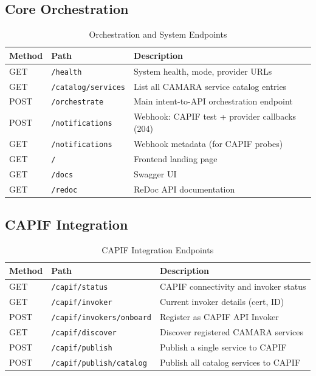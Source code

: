 \documentclass[conference]{IEEEtran}
\begin{document}
\subsection{Core Orchestration}

\begin{table}[H]
\centering
\caption{Orchestration and System Endpoints}
\label{tab:api-core}
\scriptsize
\begin{tabularx}{\columnwidth}{llX}
\toprule
\textbf{Method} & \textbf{Path} & \textbf{Description} \\
\midrule
GET & \texttt{/health} & System health, mode, provider URLs \\
GET & \texttt{/catalog/services} & List all CAMARA service catalog entries \\
POST & \texttt{/orchestrate} & Main intent-to-API orchestration endpoint \\
POST & \texttt{/notifications} & Webhook: CAPIF test + provider callbacks (204) \\
GET & \texttt{/notifications} & Webhook metadata (for CAPIF probes) \\
GET & \texttt{/} & Frontend landing page \\
GET & \texttt{/docs} & Swagger UI \\
GET & \texttt{/redoc} & ReDoc API documentation \\
\bottomrule
\end{tabularx}
\end{table}

\subsection{CAPIF Integration}

\begin{table}[H]
\centering
\caption{CAPIF Integration Endpoints}
\label{tab:api-capif}
\scriptsize
\begin{tabularx}{\columnwidth}{llX}
\toprule
\textbf{Method} & \textbf{Path} & \textbf{Description} \\
\midrule
GET & \texttt{/capif/status} & CAPIF connectivity and invoker status \\
GET & \texttt{/capif/invoker} & Current invoker details (cert, ID) \\
POST & \texttt{/capif/invokers/onboard} & Register as CAPIF API Invoker \\
GET & \texttt{/capif/discover} & Discover registered CAMARA services \\
POST & \texttt{/capif/publish} & Publish a single service to CAPIF \\
POST & \texttt{/capif/publish/catalog} & Publish all catalog services to CAPIF \\
\bottomrule
\end{tabularx}
\end{table}
\end{document}
